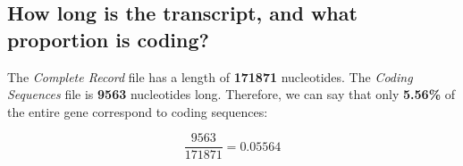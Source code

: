 
\subsection{How long is the transcript, and what proportion is coding?}

The \textit{Complete Record} file has a length of \textbf{171871} nucleotides. The \textit{Coding Sequences} file is \textbf{9563} nucleotides long. Therefore, we can say that only \textbf{5.56\%} of the entire gene correspond to coding sequences:

\[
\frac{9563}{171871} = 0.05564
\]

\newpage
